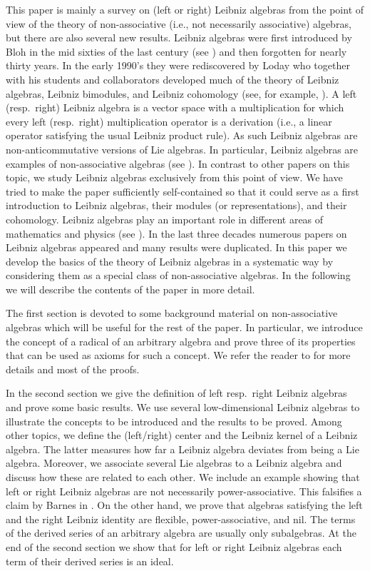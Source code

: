 \documentclass{amsart}
\numberwithin{equation}{section}
\begin{document}
This paper is mainly a survey on (left or right) Leibniz algebras from the point of view of
the theory of non-associative (i.e., not necessarily associative) algebras, but there are
also several new results. Leibniz algebras were first introduced by Bloh in the mid sixties
of the last century (see \cite{Bl1,Bl2,Bl3}) and then forgotten for nearly thirty years. In
the early 1990's  they were rediscovered by Loday who together with his students and
collaborators developed much of the theory of Leibniz algebras, Leibniz bimodules, and
Leibniz cohomology (see, for example, \cite{L,LP1,C}). A left (resp.\ right) Leibniz algebra
is a vector space with a multiplication for which every left (resp.\ right) multiplication operator
is a derivation (i.e., a linear operator satisfying the usual Leibniz product rule). As such
Leibniz algebras are non-anticommutative versions of Lie algebras. In particular, Leibniz
algebras are examples of non-associative algebras (see \cite{S}). In contrast to other
papers on this topic, we study Leibniz algebras exclusively from this point of view. We
have tried to make the paper sufficiently self-contained so that it could serve as a first
introduction to Leibniz algebras, their modules (or representations), and their cohomology.
Leibniz algebras play an important role in different areas of mathematics and physics (see
\cite{L}). In the last three decades numerous papers on Leibniz algebras appeared and
many results were duplicated. In this paper we develop the basics of the theory of Leibniz
algebras in a systematic way by considering them as a special class of non-associative
algebras. In the following we will describe the contents of the paper in more detail.

The first section is devoted to some background material on non-associative algebras which
will be useful for the rest of the paper. In particular, we introduce the concept of a radical
of an arbitrary algebra and prove three of its properties that can be used as axioms for
such a concept. We refer the reader to \cite{S} for more details and most of the proofs.

In the second section we give the definition of left resp.\ right Leibniz algebras and prove
some basic results. We use several low-dimensional Leibniz algebras to illustrate the concepts
to be introduced and the results to be proved. Among other topics, we define the (left/right)
center and the Leibniz kernel of a Leibniz algebra. The latter measures how far a Leibniz
algebra deviates from being a Lie algebra. Moreover, we associate several Lie algebras to
a Leibniz algebra and discuss how these are related to each other. We include an example
showing that left or right Leibniz algebras are not necessarily power-associative. This falsifies
a claim by Barnes in \cite{B1}. On the other hand, we prove that algebras satisfying the left
and the right Leibniz identity are flexible, power-associative, and nil. The terms of the derived
series of an arbitrary algebra are usually only subalgebras. At the end of the second section
we show that for left or right Leibniz algebras each term of their derived series is an ideal.
\end{document}
